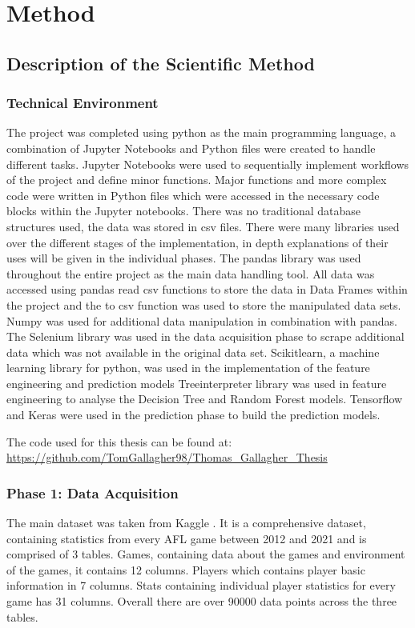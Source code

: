\documentclass{imc-inf}
\begin{document}
	
	\chapter{Method}\label{chap:method}
	\section{Description of the Scientific Method }
	
	\subsection{Technical Environment}
	The project was completed using python as the main programming language, a combination of Jupyter Notebooks and Python files were created to handle different tasks. Jupyter Notebooks were used to sequentially implement workflows of the project and define minor functions. Major functions and more complex code were written in Python files which were accessed in the necessary code blocks within the Jupyter notebooks. There was no traditional database structures used, the data was stored in csv files. 
	There were many libraries used over the different stages of the implementation, in depth explanations of their uses will be given in the individual phases. The pandas library was used throughout the entire project as the main data handling tool. All data was accessed using pandas read csv functions to store the data in Data Frames within the project and the to csv function was used to store the manipulated data sets.
	Numpy was used for additional data manipulation in combination with pandas.  
	The Selenium library was used in the data acquisition phase to scrape additional data which was not available in the original data set.
	Scikitlearn, a machine learning library for python, was used in the implementation of the feature engineering and prediction models
	Treeinterpreter library was used in feature engineering to analyse the Decision Tree and Random Forest models.
	Tensorflow and Keras were used in the prediction phase to build the prediction models.
	
	The code used for this thesis can be found at:  \url{https://github.com/TomGallagher98/Thomas_Gallagher_Thesis}
	
	\subsection{Phase 1: Data Acquisition}
	The main dataset was taken from Kaggle \cite{stone}. It is a comprehensive dataset, containing statistics from every AFL game between 2012 and 2021 and is comprised of 3 tables. Games, containing data about the games and environment of the games, it contains 12 columns. Players which contains player basic information in 7 columns. Stats containing individual player statistics for every game has 31 columns. Overall there are over 90000 data points across the three tables.
	
\end{document}
